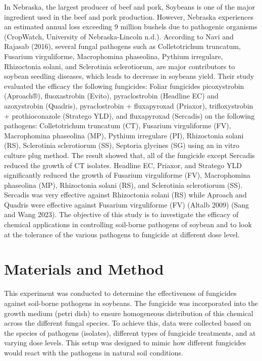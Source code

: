 \documentclass[
  10pt,
  letterpaper,
  twocolumn]{article}
\begin{document}
In Nebraska, the largest producer of beef and pork, Soybeans is one of
the major ingredient used in the beef and pork production. However,
Nebraska experiences an estimated annual loss exceeding 9 million
bushels due to pathogenic organisms (CropWatch, University of
Nebraska-Lincoln n.d.). According to Navi and Rajasab (2016), several
fungal pathogens such as Colletotrichum truncatum, Fusarium
virguliforme, Macrophomina phaseolina, Pythium irregulare, Rhizoctonia
solani, and Sclerotinia sclerotiorum, are major contributors to soybean
seedling diseases, which leads to decrease in soybeans yield. Their
study evaluated the efficacy the following fungicides: Foliar fungicides
picoxystrobin (Aproach®), fluoxastrobin (Evito), pyraclostrobin
(Headline EC) and azoxystrobin (Quadris), pyraclostrobin + fluxapyroxad
(Priaxor), trifloxystrobin + prothioconazole (Stratego YLD), and
fluxapyroxad (Sercadis) on the following pathogens: Colletotrichum
truncatum (CT), Fusarium virguliforme (FV), Macrophomina phaseolina
(MP), Pythium irregulare (PI), Rhizoctonia solani (RS), Sclerotinia
sclerotiorum (SS), Septoria glycines (SG) using an in vitro culture plug
method. The result showed that, all of the fungicide except Sercadis
reduced the growth of CT isolates. Headline EC, Priaxor, and Stratego
YLD significantly reduced the growth of Fusarium virguliforme (FV),
Macrophomina phaseolina (MP), Rhizoctonia solani (RS), and Sclerotinia
sclerotiorum (SS). Sercadis was very effective against Rhizoctonia
solani (RS) while Aproach and Quadris were effective against Fusarium
virguliforme (FV) (Altalb 2009) (Sang and Wang 2023). The objective of
this study is to investigate the efficacy of chemical applications in
controlling soil-borne pathogens of soybean and to look at the tolerance
of the various pathogens to fungicide at different dose level.

\hypertarget{materials-and-method}{%
\section{Materials and Method}\label{materials-and-method}}

\vspace{-1em}

This experiment was conducted to determine the effectiveness of
fungicides against soil-borne pathogens in soybeans. The fungicide was
incorporated into the growth medium (petri dish) to ensure homogeneous
distribution of this chemical across the different fungal species. To
achieve this, data were collected based on the species of pathogens
(isolates), different types of fungicide treatments, and at varying dose
levels. This setup was designed to mimic how different fungicides would
react with the pathogens in natural soil conditions.
\end{document}
